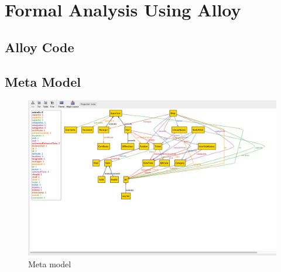 \section{Formal Analysis Using Alloy}




\def\alloy{\lstinline[
	language=alloy,
	style=alloy,
	basicstyle=\ttfamily\small
]}

\renewcommand{\ttdefault}{pcr}  %
\lstset{
	basicstyle=\ttfamily\large
}

\subsection{Alloy Code}

\clearpage

\subsection{Meta Model}

\begin{figure}[H]
  \centering
  \includegraphics[width=0.9\textheight,keepaspectratio, angle=90]{images/alloy_metamodel.png}
  \caption{Meta model}
\end{figure}
\clearpage

